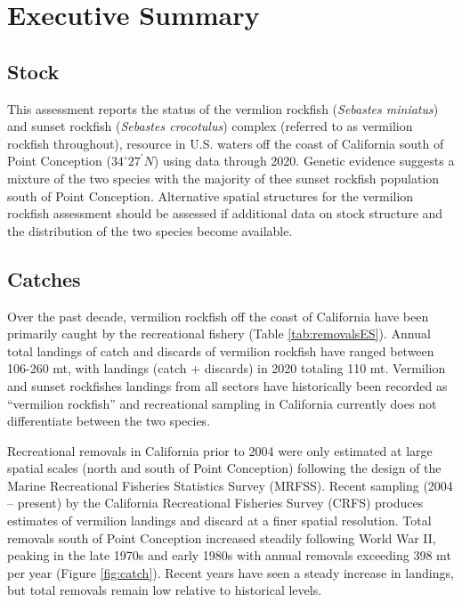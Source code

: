 \documentclass[11pt,
  english,
  a4paper,
]{article}
\begin{document}
\hypertarget{executive-summary}{%
\section*{Executive Summary}\label{executive-summary}}

\leavevmode\tagmcend\tagstructend


\hypertarget{stock}{%
\subsection{Stock}\label{stock}}

\leavevmode\tagmcend\tagstructend

This assessment reports the status of the vermlion rockfish (\emph{Sebastes miniatus}) and sunset rockfish (\emph{Sebastes crocotulus}) complex (referred to as vermilion rockfish throughout), resource in U.S. waters off the coast of California south of Point Conception ($34^\circ 27^\prime N$) using data through 2020. Genetic evidence suggests a mixture of the two species with the majority of thee sunset rockfish population south of Point Conception. Alternative spatial structures for the vermilion rockfish assessment should be assessed if additional data on stock structure and the distribution of the two species become available.


\hypertarget{catches}{%
\subsection*{Catches}\label{catches}}

\leavevmode\tagmcend\tagstructend

Over the past decade, vermilion rockfish off the coast of California have been primarily caught by the recreational fishery (Table \ref{tab:removalsES}). Annual total landings of catch and discards of vermilion rockfish have ranged between 106-260 mt, with landings (catch + discards) in 2020 totaling 110 mt. Vermilion and sunset rockfishes landings from all sectors have historically been recorded as ``vermilion rockfish'' and recreational sampling in California currently does not differentiate between the two species.

Recreational removals in California prior to 2004 were only estimated at large spatial scales (north and south of Point Conception) following the design of the Marine Recreational Fisheries Statistics Survey (MRFSS). Recent sampling (2004 -- present) by the California Recreational Fisheries Survey (CRFS) produces estimates of vermilion landings and discard at a finer spatial resolution. Total removals south of Point Conception increased steadily following World War II, peaking in the late 1970s and early 1980s with annual removals exceeding 398 mt per year (Figure \ref{fig:catch}). Recent years have seen a steady increase in landings, but total removals remain low relative to historical levels.
\end{document}
